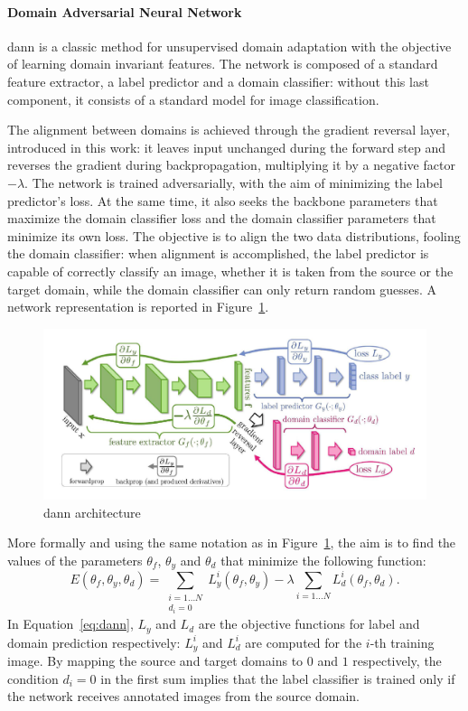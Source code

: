 \documentclass[%
    corpo=12pt,
    twoside,
    stile=classica,   
    tipotesi=magistrale,
    evenboxes,
    english,
	numerazioneromana,
]{toptesi}
\begin{document}
\paragraph{Domain Adversarial Neural Network}\label{sec:dann}
\gls{dann}\cite{ganin2015unsupervised} is a classic method for unsupervised domain adaptation with the objective of learning domain invariant features. The network is composed of a standard feature extractor, a label predictor and a domain classifier: without this last component, it consists of a standard model for image classification.

The alignment between domains is achieved through the gradient reversal layer, introduced in this work: it leaves input unchanged during the forward step and reverses the gradient during backpropagation, multiplying it by a negative factor $-\lambda$. The network is trained adversarially, with the aim of minimizing the label predictor’s loss. 
At the same time, it also seeks the backbone parameters that maximize the domain classifier loss and the domain classifier parameters that minimize its own loss.
The objective is to align the two data distributions, fooling the domain classifier: when alignment is accomplished, the label predictor is capable of correctly classify an image, whether it is taken from the source or the target domain, while the domain classifier can only return random guesses. A network representation is reported in Figure~\ref{fig:dann}.

\begin{figure}[ht!]
	\centering
	\includegraphics[width=0.9\linewidth]{imgs/dann.png}
	\caption{\gls{dann} architecture\cite{ganin2015unsupervised}}
	\label{fig:dann}
\end{figure}

More formally and using the same notation as in Figure~\ref{fig:dann}, the aim is to find the values of the parameters $\theta_f$, $\theta_y$ and $\theta_d$ that minimize the following function:
\begin{equation}
	E(\theta_f, \theta_y, \theta_d) = \sum_{
		\substack{i=1\ldots N\\d_i=0}
	}L^{i}_{y}\left(\theta_f, \theta_y\right) - 
	\lambda \sum_{i=1\ldots N}L^{i}_{d}\left(\theta_f, \theta_d\right).
	\label{eq:dann}
\end{equation}
In Equation~\ref{eq:dann}, $L_y$ and $L_d$ are the objective functions for label and domain prediction respectively: $L^{i}_{y}$ and $L^{i}_{d}$ are computed for the $i$-th training image. By mapping the source and target domains to $0$ and $1$ respectively, the condition $d_i=0$ in the first sum implies that the label classifier is trained only if the network receives annotated images from the source domain.
\end{document}
